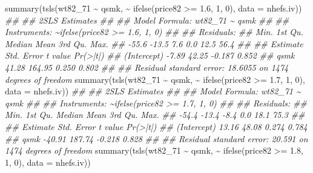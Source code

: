 \documentclass[
  10pt,
  a4paper,
]{book}
\newenvironment{Shaded}{\begin{snugshade}}{\end{snugshade}}
\newcommand{\AttributeTok}[1]{\textcolor[rgb]{0.40,0.45,0.13}{#1}}
\newcommand{\DecValTok}[1]{\textcolor[rgb]{0.68,0.00,0.00}{#1}}
\newcommand{\DocumentationTok}[1]{\textcolor[rgb]{0.37,0.37,0.37}{\textit{#1}}}
\newcommand{\FloatTok}[1]{\textcolor[rgb]{0.68,0.00,0.00}{#1}}
\newcommand{\FunctionTok}[1]{\textcolor[rgb]{0.28,0.35,0.67}{#1}}
\newcommand{\NormalTok}[1]{\textcolor[rgb]{0.00,0.46,0.62}{#1}}
\newcommand{\SpecialCharTok}[1]{\textcolor[rgb]{0.37,0.37,0.37}{#1}}
\begin{document}
\begin{Shaded}
\begin{Highlighting}[]
\FunctionTok{summary}\NormalTok{(}\FunctionTok{tsls}\NormalTok{(wt82\_71 }\SpecialCharTok{\textasciitilde{}}\NormalTok{ qsmk, }\SpecialCharTok{\textasciitilde{}} \FunctionTok{ifelse}\NormalTok{(price82 }\SpecialCharTok{\textgreater{}=} \FloatTok{1.6}\NormalTok{, }\DecValTok{1}\NormalTok{, }\DecValTok{0}\NormalTok{), }\AttributeTok{data =}\NormalTok{ nhefs.iv))}
\DocumentationTok{\#\# }
\DocumentationTok{\#\#  2SLS Estimates}
\DocumentationTok{\#\# }
\DocumentationTok{\#\# Model Formula: wt82\_71 \textasciitilde{} qsmk}
\DocumentationTok{\#\# }
\DocumentationTok{\#\# Instruments: \textasciitilde{}ifelse(price82 \textgreater{}= 1.6, 1, 0)}
\DocumentationTok{\#\# }
\DocumentationTok{\#\# Residuals:}
\DocumentationTok{\#\#    Min. 1st Qu.  Median    Mean 3rd Qu.    Max. }
\DocumentationTok{\#\#   {-}55.6   {-}13.5     7.6     0.0    12.5    56.4 }
\DocumentationTok{\#\# }
\DocumentationTok{\#\#             Estimate Std. Error t value Pr(\textgreater{}|t|)}
\DocumentationTok{\#\# (Intercept)    {-}7.89      42.25  {-}0.187    0.852}
\DocumentationTok{\#\# qsmk           41.28     164.95   0.250    0.802}
\DocumentationTok{\#\# }
\DocumentationTok{\#\# Residual standard error: 18.6055 on 1474 degrees of freedom}
\FunctionTok{summary}\NormalTok{(}\FunctionTok{tsls}\NormalTok{(wt82\_71 }\SpecialCharTok{\textasciitilde{}}\NormalTok{ qsmk, }\SpecialCharTok{\textasciitilde{}} \FunctionTok{ifelse}\NormalTok{(price82 }\SpecialCharTok{\textgreater{}=} \FloatTok{1.7}\NormalTok{, }\DecValTok{1}\NormalTok{, }\DecValTok{0}\NormalTok{), }\AttributeTok{data =}\NormalTok{ nhefs.iv))}
\DocumentationTok{\#\# }
\DocumentationTok{\#\#  2SLS Estimates}
\DocumentationTok{\#\# }
\DocumentationTok{\#\# Model Formula: wt82\_71 \textasciitilde{} qsmk}
\DocumentationTok{\#\# }
\DocumentationTok{\#\# Instruments: \textasciitilde{}ifelse(price82 \textgreater{}= 1.7, 1, 0)}
\DocumentationTok{\#\# }
\DocumentationTok{\#\# Residuals:}
\DocumentationTok{\#\#    Min. 1st Qu.  Median    Mean 3rd Qu.    Max. }
\DocumentationTok{\#\#   {-}54.4   {-}13.4    {-}8.4     0.0    18.1    75.3 }
\DocumentationTok{\#\# }
\DocumentationTok{\#\#             Estimate Std. Error t value Pr(\textgreater{}|t|)}
\DocumentationTok{\#\# (Intercept)    13.16      48.08   0.274    0.784}
\DocumentationTok{\#\# qsmk          {-}40.91     187.74  {-}0.218    0.828}
\DocumentationTok{\#\# }
\DocumentationTok{\#\# Residual standard error: 20.591 on 1474 degrees of freedom}
\FunctionTok{summary}\NormalTok{(}\FunctionTok{tsls}\NormalTok{(wt82\_71 }\SpecialCharTok{\textasciitilde{}}\NormalTok{ qsmk, }\SpecialCharTok{\textasciitilde{}} \FunctionTok{ifelse}\NormalTok{(price82 }\SpecialCharTok{\textgreater{}=} \FloatTok{1.8}\NormalTok{, }\DecValTok{1}\NormalTok{, }\DecValTok{0}\NormalTok{), }\AttributeTok{data =}\NormalTok{ nhefs.iv))}

\end{Highlighting}
\end{Shaded}
\end{document}
